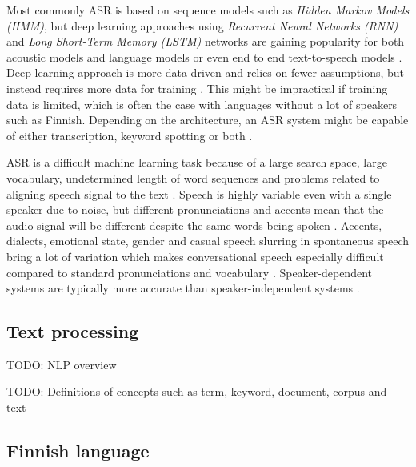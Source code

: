 \documentclass[utf8,english]{gradu3}
\begin{document}
Most commonly ASR is based on sequence models such as \emph{Hidden Markov Models (HMM)}, but deep learning approaches using \emph{Recurrent Neural Networks (RNN)} and \emph{Long Short-Term Memory (LSTM)} networks are gaining popularity for both acoustic models and language models or even end to end text-to-speech models \parencite{bengioWordEmbeddingsSpeech2014,enarviAutomaticSpeechRecognition2017}. Deep learning approach is more data-driven and relies on fewer assumptions, but instead requires more data for training \parencite{bengioWordEmbeddingsSpeech2014}. This might be impractical if training data is limited, which is often the case with languages without a lot of speakers such as Finnish. Depending on the architecture, an ASR system might be capable of either transcription, keyword spotting or both \parencite{juangAutomaticSpeechRecognition2005,enarviAutomaticSpeechRecognition2017}.

ASR is a difficult machine learning task because of a large search space, large vocabulary, undetermined length of word sequences and problems related to aligning speech signal to the text \parencite{enarviAutomaticSpeechRecognition2017}. Speech is highly variable even with a single speaker due to noise, but different pronunciations and accents mean that the audio signal will be different despite the same words being spoken \parencite{juangAutomaticSpeechRecognition2005}. Accents, dialects, emotional state, gender and casual speech slurring in spontaneous speech bring a lot of variation which makes conversational speech especially difficult compared to standard pronunciations and vocabulary \parencite{benzeghibaAutomaticSpeechRecognition2007, juangAutomaticSpeechRecognition2005}. Speaker-dependent systems are typically more accurate than speaker-independent systems \parencite{benzeghibaAutomaticSpeechRecognition2007,enarviAutomaticSpeechRecognition2017}.





\subsection{Text processing}


TODO: NLP overview \parencite{silfverbergFinnPosOpensourceMorphological2016,kanervaTurkuNeuralParser2018}

TODO: Definitions of concepts such as term, keyword, document, corpus and text

\subsection{Finnish language}
\end{document}

